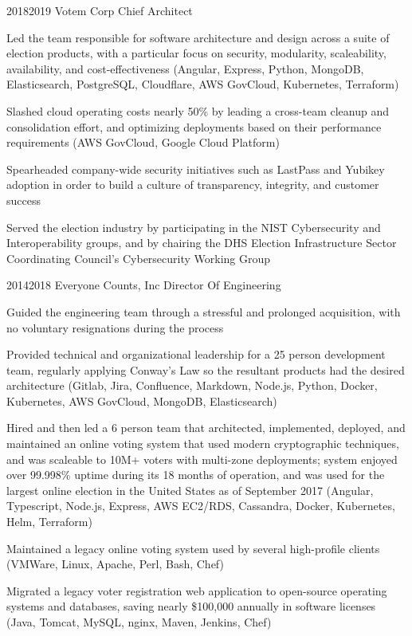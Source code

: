 \documentclass{article}
\begin{document}
\job
  {2018}{2019}
  {Votem Corp}
  {Chief Architect}
  {\begin{achievements}
    \item Led the team responsible for software architecture and design across a suite of election products, with a particular focus on security, modularity, scaleability, availability, and cost-effectiveness (Angular, Express, Python, MongoDB, Elasticsearch, PostgreSQL, Cloudflare, AWS GovCloud, Kubernetes, Terraform)
    \item Slashed cloud operating costs nearly 50\% by leading a cross-team cleanup and consolidation effort, and optimizing deployments based on their performance requirements (AWS GovCloud, Google Cloud Platform)
    \item Spearheaded company-wide security initiatives such as LastPass and Yubikey adoption in order to build a culture of transparency, integrity, and customer success
    \item Served the election industry by participating in the NIST Cybersecurity and Interoperability groups, and by chairing the DHS Election Infrastructure Sector Coordinating Council's Cybersecurity Working Group
  \end{achievements}}

\pagebreak

\job
  {2014}{2018}
  {Everyone Counts, Inc}
  {Director Of Engineering}
  {\begin{achievements}
    \item Guided the engineering team through a stressful and prolonged acquisition, with no voluntary resignations during the process
    \item Provided technical and organizational leadership for a 25 person development team, regularly applying Conway's Law so the resultant products had the desired architecture (Gitlab, Jira, Confluence, Markdown, Node.js, Python, Docker, Kubernetes, AWS GovCloud, MongoDB, Elasticsearch)
    \item Hired and then led a 6 person team that architected, implemented, deployed, and maintained an online voting system that used modern cryptographic techniques, and was scaleable to 10M+ voters with multi-zone deployments; system enjoyed over 99.998\% uptime during its 18 months of operation, and was used for the largest online election in the United States as of September 2017 (Angular, Typescript, Node.js, Express, AWS EC2/RDS, Cassandra, Docker, Kubernetes, Helm, Terraform)
    \item Maintained a legacy online voting system used by several high-profile clients (VMWare, Linux, Apache, Perl, Bash, Chef)
    \item Migrated a legacy voter registration web application to open-source operating systems and databases, saving nearly \$100,000 annually in software licenses (Java, Tomcat, MySQL, nginx, Maven, Jenkins, Chef)
  \end{achievements}}
\end{document}
